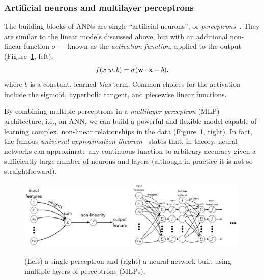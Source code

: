 \subsubsection{Artificial neurons and multilayer perceptrons}

The building blocks of ANNs are single ``artificial neurons'', or \textit{perceptrons}~\cite{rosenblatt1958perceptron}.
They are similar to the linear models discussed above, but with an additional non-linear function $\sigma$ --- known as the \textit{activation function}, applied to the output (Figure~\ref{fig:03_ml_perceptron}, left):
\begin{equation}
    \label{eq:03_ml_perceptron}
    f(x|w, b) = \sigma(\mathbf{w} \cdot \mathbf{x} + b),
\end{equation}
where $b$ is a constant, learned \textit{bias} term.
Common choices for the activation include the sigmoid, hyperbolic tangent, and piecewise linear functions.

By combining multiple perceptrons in a \textit{multilayer perceptron} (MLP) architecture, i.e., an ANN, we can build a powerful and flexible model capable of learning complex, non-linear relationships in the data (Figure~\ref{fig:03_ml_perceptron}, right).
In fact, the famous \textit{universal approximation theorem}~\cite{hornik1989multilayer} states that, in theory, neural networks can approximate any continuous function to arbitrary accuracy given a sufficiently large number of neurons and layers (although in practice it is not so straightforward).

\begin{figure}[ht]
    \centering
    \includegraphics[width=0.49\textwidth]{figures/03-ML/perceptron}
    \includegraphics[width=0.49\textwidth]{figures/03-ML/nn}
    \caption{(Left) a single perceptron and (right) a neural network built using multiple layers of perceptrons (MLPs).}
    \label{fig:03_ml_perceptron}
\end{figure}

